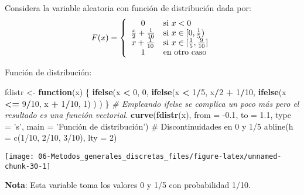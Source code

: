 \documentclass[
]{book}
\newenvironment{Shaded}{\begin{snugshade}}{\end{snugshade}}
\newcommand{\CommentTok}[1]{\textcolor[rgb]{0.56,0.35,0.01}{\textit{#1}}}
\newcommand{\ControlFlowTok}[1]{\textcolor[rgb]{0.13,0.29,0.53}{\textbf{#1}}}
\newcommand{\DataTypeTok}[1]{\textcolor[rgb]{0.13,0.29,0.53}{#1}}
\newcommand{\DecValTok}[1]{\textcolor[rgb]{0.00,0.00,0.81}{#1}}
\newcommand{\FloatTok}[1]{\textcolor[rgb]{0.00,0.00,0.81}{#1}}
\newcommand{\KeywordTok}[1]{\textcolor[rgb]{0.13,0.29,0.53}{\textbf{#1}}}
\newcommand{\NormalTok}[1]{#1}
\newcommand{\OperatorTok}[1]{\textcolor[rgb]{0.81,0.36,0.00}{\textbf{#1}}}
\newcommand{\StringTok}[1]{\textcolor[rgb]{0.31,0.60,0.02}{#1}}
\theoremstyle{break}
\theoremstyle{definition}
\theoremstyle{definition}
\theoremstyle{definition}
\theoremstyle{remark}
\let\BeginKnitrBlock\begin \let\EndKnitrBlock\end
\begin{document}
\BeginKnitrBlock{exercise}
\protect\hypertarget{exr:unnamed-chunk-29}{}{\label{exr:unnamed-chunk-29} }
\EndKnitrBlock{exercise}

Considera la variable aleatoria con función
de distribución dada por:
\[F(x)=\left\{
\begin{array}
[c]{cl}0 & \mbox{si $x<0$}\\
\frac{x}{2}+\frac{1}{10} & \mbox{si $x\in[0,\frac{1}{5})$}\\
x+\frac{1}{10} & \mbox{si $x\in[\frac{1}{5},\frac{9}{10}]$}\\
1 & \mbox{en otro caso}
\end{array}
\right.\]

Función de distribución:

\begin{Shaded}
\begin{Highlighting}[]
\NormalTok{fdistr <-}\StringTok{ }\ControlFlowTok{function}\NormalTok{(x) \{}
\KeywordTok{ifelse}\NormalTok{(x }\OperatorTok{<}\StringTok{ }\DecValTok{0}\NormalTok{, }\DecValTok{0}\NormalTok{,}
    \KeywordTok{ifelse}\NormalTok{(x }\OperatorTok{<}\StringTok{ }\DecValTok{1}\OperatorTok{/}\DecValTok{5}\NormalTok{, x}\OperatorTok{/}\DecValTok{2} \OperatorTok{+}\StringTok{ }\DecValTok{1}\OperatorTok{/}\DecValTok{10}\NormalTok{,}
        \KeywordTok{ifelse}\NormalTok{(x }\OperatorTok{<=}\StringTok{ }\DecValTok{9}\OperatorTok{/}\DecValTok{10}\NormalTok{, x }\OperatorTok{+}\StringTok{ }\DecValTok{1}\OperatorTok{/}\DecValTok{10}\NormalTok{, }\DecValTok{1}\NormalTok{) ) )}
\NormalTok{\}}
\CommentTok{# Empleando ifelse se complica un poco más pero el resultado es una función vectorial.}
\KeywordTok{curve}\NormalTok{(}\KeywordTok{fdistr}\NormalTok{(x), }\DataTypeTok{from =} \FloatTok{-0.1}\NormalTok{, }\DataTypeTok{to =} \FloatTok{1.1}\NormalTok{, }\DataTypeTok{type =} \StringTok{'s'}\NormalTok{, }
      \DataTypeTok{main =} \StringTok{'Función de distribución')}
\StringTok{# Discontinuidades en 0 y 1/5}
\StringTok{abline(h = c(1/10, 2/10, 3/10), lty = 2) }
\end{Highlighting}
\end{Shaded}

\begin{center}\texttt{[image: 06-Metodos\_generales\_discretas\_files/figure-latex/unnamed-chunk-30-1]} \end{center}

\textbf{Nota}: Esta variable toma los valores 0 y 1/5 con probabilidad 1/10.
\end{document}
